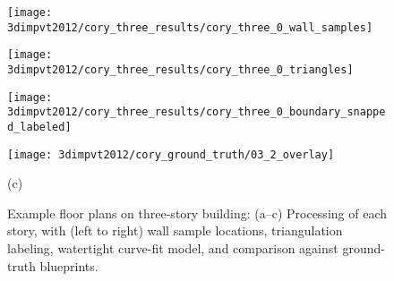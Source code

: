 \documentclass[12pt,onecolumn,oneside]{book}
\begin{document}
\begin{figure}[p]
\begin{minipage}[b]{0.24\linewidth}
  \centering
  \centerline{\texttt{[image: 3dimpvt2012/cory\_three\_results/cory\_three\_0\_wall\_samples]}}
\end{minipage}
\hfill
\begin{minipage}[b]{0.24\linewidth}
  \centering
  \centerline{\texttt{[image: 3dimpvt2012/cory\_three\_results/cory\_three\_0\_triangles]}}
\end{minipage}
\hfill
\begin{minipage}[b]{0.24\linewidth}
  \centering
  \centerline{\texttt{[image: 3dimpvt2012/cory\_three\_results/cory\_three\_0\_boundary\_snapped\_labeled]}}
\end{minipage}
\hfill
\begin{minipage}[b]{0.24\linewidth}
  \centering
  \centerline{\texttt{[image: 3dimpvt2012/cory\_ground\_truth/03\_2\_overlay]}}
\end{minipage}
\centerline{(c)}
\linebreak

\caption[Example floor plan on three-story building.]{Example floor plans on three-story building: (a--c) Processing of each story, with (left to right) wall sample locations, triangulation labeling, watertight curve-fit model, and comparison against ground-truth blueprints.}
\label{fig:cory_three_results}

\end{figure}

\end{document}
